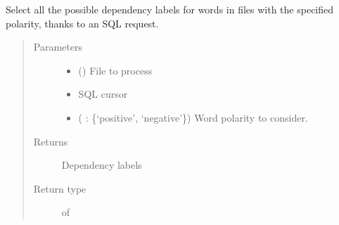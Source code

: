 \documentclass[letterpaper,10pt,english]{sphinxmanual}
\begin{document}

\begin{fulllineitems}
\label{\detokenize{analysis:loacore.analysis.frequencies.get_polarity_label_set}}
Select all the possible dependency labels for words in files with the specified polarity, thanks to an SQL request.
\begin{quote}\begin{description}
\item[{Parameters}] \leavevmode\begin{itemize}
\item {} 
 () \textendash{} File to process

\item {} 
 \textendash{} SQL cursor

\item {} 
 ( : \{‘positive’, ‘negative’\}) \textendash{} Word polarity to consider.

\end{itemize}

\item[{Returns}] \leavevmode
Dependency labels

\item[{Return type}] \leavevmode
{} of 

\end{description}\end{quote}

\end{fulllineitems}

\end{document}
